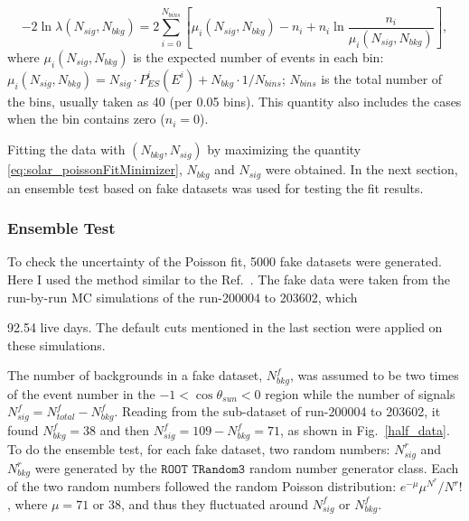 \begin{equation}\label{eq:solar_poissonFitMinimizer}
-2\ln\mathcal \lambda(N_{sig},N_{bkg})
=2\sum_{i=0}^{N_{bins}}[\mu_i(N_{sig},N_{bkg})-n_i+n_i\ln\frac{n_i}{\mu_i(N_{sig},N_{bkg})}],
\end{equation}
where $\mu_i(N_{sig},N_{bkg})$ is the expected number of events in each bin: $\mu_i(N_{sig},N_{bkg})=N_{sig}\cdot P^i_{ES}(E^i)+N_{bkg}\cdot1/N_{bins}$; $N_{bins}$ is the total number of the bins, usually taken as 40 (per 0.05 bins). This quantity also includes the cases when the bin contains zero ($n_i=0$).

Fitting the data with $(N_{bkg},N_{sig})$ by maximizing the quantity \ref{eq:solar_poissonFitMinimizer}, $N_{bkg}$ and $N_{sig}$ were obtained. In the next section, an ensemble test based on fake datasets was used for testing the fit results.
%
%
\subsubsection{Ensemble Test}
To check the uncertainty of the Poisson fit, 5000 fake datasets were generated. Here I used the method similar to the Ref.~\cite{leta}.
The fake data were taken from the run-by-run MC simulations of the run-200004 to 203602, which 

92.54 live days. The default cuts mentioned in the last section were applied on these simulations.

The number of backgrounds in a fake dataset, $N^f_{bkg}$, was assumed to be two times of the event number in the $-1<\cos\theta_{sun}<0$ region while the number of signals $N^f_{sig}=N^f_{total}-N^f_{bkg}$. Reading from the sub-dataset of run-200004 to 203602, it found $N^f_{bkg}=38$ and then $N^f_{sig}=109-N^f_{bkg}=71$, as shown in Fig.~\ref{half_data}. To do the ensemble test, for each fake dataset, two random numbers: $N^r_{sig}$ and $N^r_{bkg}$ were generated by the $\texttt{ROOT TRandom3}$ random number generator class. Each of the two random numbers followed the random Poisson distribution: $e^{-\mu}\mu^{N^r}/N^r!$, where $\mu=71$ or $38$, and thus they fluctuated around $N^f_{sig}$ or $N^f_{bkg}$.

